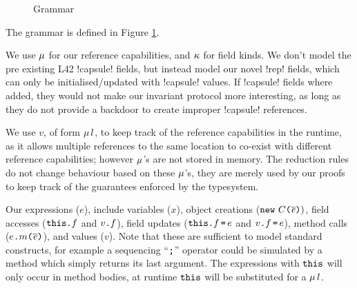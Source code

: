 \begin{figure}
\begin{grammatica}

		\\

		\\

		\\

		\\
		\\
	\end{grammatica}%
\caption{Grammar}\label{f:grammar}
\end{figure}

The grammar is defined in Figure \ref{f:grammar}.

We use $\mu$ for our reference capabilities, and $\kappa$ for field kinds. We don't model the pre existing L42 \Q!capsule! fields, but instead model our novel \Q!rep! fields, which can only be initialised/updated with \Q!capsule! values. If \Q!capsule! fields where added, they would not make our invariant protocol more interesting, as long as they do not provide a backdoor to create improper \Q!capsule! references.

We use $v$, of form $\mu\,l$, to keep track of the reference capabilities in the runtime, as it allows multiple references to the same location to co-exist with different reference capabilities; however $\mu$'s are not stored in memory.
The reduction rules do not change behaviour based on these $\mu$'s, they are merely used by our proofs to keep track of the guarantees enforced by the typesystem.

Our expressions ($e$), include variables ($x$), object creations ($\texttt{new}\ C\texttt{(}\hspace{0.03ex} \overline{\hspace{-0.03ex}\mathit{e}\hspace{-0.03ex}} \hspace{0.03ex}\texttt{)})$, field accesses ($\texttt{this}\texttt{.} f$ and $v\texttt{.} f$), field updates ($\texttt{this}\texttt{.} f \,\texttt{=}\, e$ and $v\texttt{.} f \,\texttt{=}\, e$), method calls ($e\texttt{.} m\texttt{(}\hspace{0.03ex} \overline{\hspace{-0.03ex}\mathit{e}\hspace{-0.03ex}} \hspace{0.03ex}\texttt{)}$), and values ($v$). Note that these are sufficient to model standard constructs, for example a sequencing ``$\texttt{;}$'' operator could be simulated by a method which simply returns its last argument.
The expressions with $\texttt{this}$ will only occur in method bodies, at runtime $\texttt{this}$ will be substituted for a $\mu\,l$.

